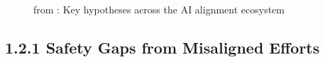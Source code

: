 \documentclass[
  11pt,
  letterpaper,
  openany]{book}
\begin{document}
\begin{figure}


\caption[Key hypotheses in AI
alignment]{\label{fig-ai-hypotheses-map}from \textcite{cottier2019}: Key
hypotheses across the AI alignment ecosystem}

\end{figure}%

\subsection{1.2.1 Safety Gaps from Misaligned
Efforts}\label{safety-gaps-from-misaligned-efforts}
\end{document}
